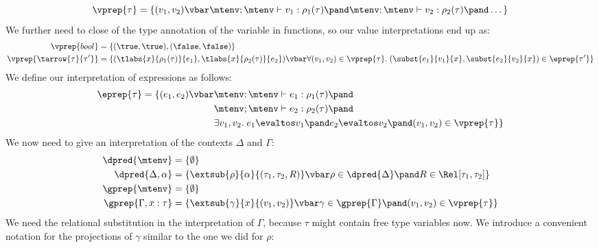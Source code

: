 \[
  \vprep{\tau} = \{(v_1,v_2) \vbar \mtenv ; \mtenv \vdash v_1 : \rho_1(\tau) \pand \mtenv ; \mtenv \vdash v_2 : \rho_2(\tau) \pand\dots \}
\]
We further need to close of the type annotation of the variable in functions, so our value interpretations end up as:
\begin{align*}
  \vprep{bool}                 & = \{ (\true,\true), (\false,\false) \} \\
  \vprep{\tarrow{\tau}{\tau'}} & = \{ (\tlabs{x}{\rho_1(\tau)}{e_1},\tlabs{x}{\rho_2(\tau)}{e_2}) \vbar \forall (v_1,v_2) \in \vprep{\tau}. \; (\subst{e_1}{v_1}{x},\subst{e_2}{v_2}{x}) \in \eprep{\tau'} \}
\end{align*}
We define our interpretation of expressions as follows:
\begin{align*}
  \eprep{\tau} = \{(e_1,e_2) \vbar & \mtenv ; \mtenv \vdash e_1 : \rho_1(\tau) \pand \\
                                   & \mtenv ; \mtenv \vdash e_2 : \rho_2(\tau) \pand \\
                                   &  \exists v_1,v_2.\; e_1 \evaltos v_1 \pand
                                            e_2 \evaltos v_2 \pand
                                            (v_1,v_2) \in \vprep{\tau} \}
\end{align*}
We now need to give an interpretation of the contexts $\Delta$ and $\Gamma$:
\begin{align*}
  \dpred{\mtenv}         &= \{\emptyset \} \\
  \dpred{\Delta, \alpha} &= \{\extsub{\rho}{\alpha}{(\tau_1,\tau_2,R)} \vbar
                                 \rho \in \dpred{\Delta} \pand
                                 R \in \Rel[\tau_1,\tau_2] \} \\
  \gprep{\mtenv}         &= \{\emptyset \} \\
  \gprep{\Gamma, x:\tau} &= \{\extsub{\gamma}{x}{(v_1,v_2)} \vbar
                                 \gamma \in \gprep{\Gamma} \pand
                                 (v_1,v_2) \in \vprep{\tau}\}
\end{align*}
We need the relational substitution in the interpretation of $\Gamma$, because $\tau$ might contain free type variables now.
We introduce a convenient notation for the projections of $\gamma$ similar to the one we did for $\rho$: %

